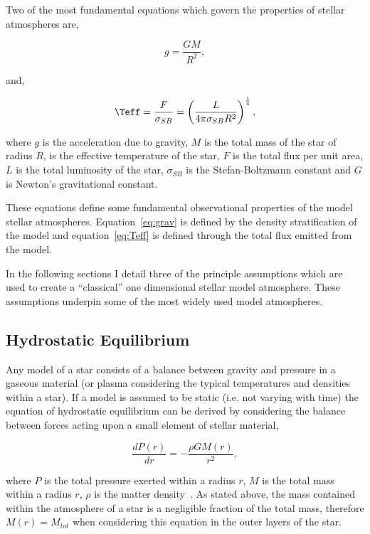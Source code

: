 Two of the most fundamental equations which govern the properties of stellar atmospheres are,

\begin{equation}
    g = \frac{GM}{R^2},\label{eq:grav}
\end{equation}

\noindent and,

\begin{equation}
    \Teff = \frac{F}{\sigma_{SB}} = \left(\frac{L}{4\pi \sigma_{SB}R^2}\right)^\frac{1}{4},\label{eq:Teff}
\end{equation}

\noindent where $g$ is the acceleration due to gravity, $M$ is the total mass of the star of radius $R$, \Teff is the effective temperature of the star, $F$ is the total flux per unit area, $L$ is the total luminosity of the star, $\sigma_{SB}$ is the Stefan-Boltzmann constant and $G$ is Newton's gravitational constant.

These equations define some fundamental observational properties of the model stellar atmospheres.
Equation~\ref{eq:grav} is defined by the density stratification of the model and equation~\ref{eq:Teff} is defined through the total flux emitted from the model.

In the following sections I detail three of the principle assumptions which are used to create a ``classical'' one dimensional stellar model atmosphere.
These assumptions underpin some of the most widely used model atmospheres.


\subsection{Hydrostatic Equilibrium} %
\label{sub:hydrostatic_equilibrium}

Any model of a star consists of a balance between gravity and pressure in a gaseous material (or plasma considering the typical temperatures and densities within a star).
If a model is assumed to be static (i.e. not varying with time) the equation of hydrostatic equilibrium can be derived by considering the balance between forces acting upon a small element of stellar material,

\begin{equation}
    \frac{dP(r)}{dr} = -\frac{\rho GM(r)}{r^2},\label{eq:hydro}
\end{equation}

\noindent where $P$ is the total pressure exerted within a radius $r$, $M$ is the total mass within a radius $r$, $\rho$ is the matter density~\citep[see Chapter 9 of ][for a simple derivation of this equation]{1989isa2.book.....B}.
As stated above, the mass contained within the atmosphere of a star is a negligible fraction of the total mass, therefore $M(r) = M_{tot}$ when considering this equation in the outer layers of the star.

